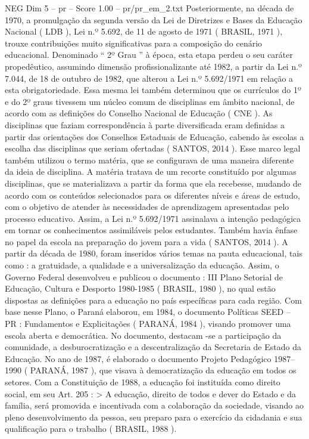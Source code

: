 \begin{textsample}{NEG Dim 5 – pr – Score 1.00 – pr/pr\_em\_2.txt}
Posteriormente, na década de 1970, a promulgação da segunda versão da Lei de Diretrizes e Bases da Educação Nacional ( LDB ), Lei n.º 5.692, de 11 de agosto de 1971 ( BRASIL, 1971 ), trouxe contribuições muito significativas para a composição do cenário educacional.
Denominado “ 2º Grau ” à época, esta etapa perdeu o seu caráter propedêutico, assumindo dimensão profissionalizante até 1982, a partir da Lei n.º 7.044, de 18 de outubro de 1982, que alterou a Lei n.º 5.692/1971 em relação a esta obrigatoriedade.
Essa mesma lei também determinou que os currículos do 1º e do 2º graus tivessem um núcleo comum de disciplinas em âmbito nacional, de acordo com as definições do Conselho Nacional de Educação ( CNE ).
As disciplinas que faziam correspondência à parte diversificada eram definidas a partir das orientações dos Conselhos Estaduais de Educação, cabendo às escolas a escolha das disciplinas que seriam ofertadas ( SANTOS, 2014 ).
Esse marco legal também utilizou o termo matéria, que se configurava de uma maneira diferente da ideia de disciplina.
A matéria tratava de um recorte constituído por algumas disciplinas, que se materializava a partir da forma que ela recebesse, mudando de acordo com os conteúdos selecionados para os diferentes níveis e áreas de estudo, com o objetivo de atender às necessidades de aprendizagem apresentadas pelo processo educativo.
Assim, a Lei n.º 5.692/1971 assinalava a intenção pedagógica em tornar os conhecimentos assimiláveis pelos estudantes.
Também havia ênfase no papel da escola na preparação do jovem para a vida ( SANTOS, 2014 ).
A partir da década de 1980, foram inseridos vários temas na pauta educacional, tais como : a gratuidade, a qualidade e a universalização da educação.
Assim, o Governo Federal desenvolveu e publicou o documento : III Plano Setorial de Educação, Cultura e Desporto 1980-1985 ( BRASIL, 1980 ), no qual estão dispostas as definições para a educação no país específicas para cada região.
Com base nesse Plano, o Paraná elaborou, em 1984, o documento Políticas SEED – PR : Fundamentos e Explicitações ( PARANÁ, 1984 ), visando promover uma escola aberta e democrática.
No documento, destacam -se a participação da comunidade, a desburocratização e a descentralização da Secretaria de Estado da Educação.
No ano de 1987, é elaborado o documento Projeto Pedagógico 1987–1990 ( PARANÁ, 1987 ), que visava à democratização da educação em todos os setores.
Com a Constituição de 1988, a educação foi instituída como direito social, em seu Art. 205 : > A educação, direito de todos e dever do Estado e da família, será promovida e incentivada com a colaboração da sociedade, visando ao pleno desenvolvimento da pessoa, seu preparo para o exercício da cidadania e sua qualificação para o trabalho ( BRASIL, 1988 ).

\end{textsample}

